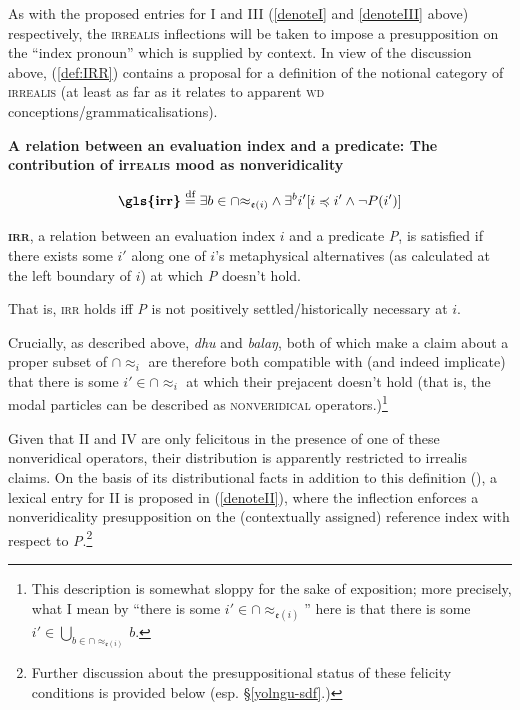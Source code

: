 \xe



As with the proposed entries for \gls{I} and \gls{III} (\ref{denoteI} and \ref{denoteIII} above) respectively, the \textsc{irrealis} inflections will be taken to impose a presupposition on the ``index pronoun'' which is supplied by context. In view of the discussion above, (\ref{def:IRR}) contains a proposal for a definition of the notional category of \textsc{irrealis} (at least as far as it relates to apparent \textsc{wd} conceptions\slash{}grammatical\-isations). 




\ex \textbf{A relation between an evaluation index and a predicate: The contribution of \gls{irr}\textsc{ealis} mood as nonveridicality}\label{def:IRR}


$$ \textbf{\gls{irr}}\overset{\text{df}}{=} \exists b\in\cap{\approx_{\mathfrak e(i)}}\wedge\exists^b i'[i\preccurlyeq i'\wedge\neg P(i')] $$

\textbf{\textsc{irr}}, a relation between an evaluation index $ i $ and a predicate \textit{P}, is satisfied if there exists some $ i' $ along one of $ i $'s metaphysical alternatives (as calculated at the left boundary of $ i $) at which \textit{P} doesn't hold.

That is, \textsc{irr} holds iff \textit{P} is not positively settled/historically necessary at $ i $.

\xe


Crucially, as described above, \textit{dhu} and \textit{balaŋ}, both of which make a claim about a proper subset of $ \cap{\approx_i} $ are therefore both compatible with (and indeed implicate) that there is some $ i'\in\cap{\approx_i} $ at which their prejacent doesn't hold (that is, the modal particles can be described as \textsc{nonveridical} operators.)\footnote{This description is somewhat sloppy for the sake of exposition; more precisely, what I mean by ``there is some $ i'\in\cap{\approx_{\mathfrak e(i)}} $'' here is that there is some $ i' \in \bigcup\limits_{b\in\cap{\approx_{\mathfrak e(i)}}}\!b$.}

Given that \gls{II} and \gls{IV} are only felicitous in the presence of one of these nonveridical operators, their distribution is apparently restricted to irrealis claims. On the basis of its distributional facts in addition to this definition (\lastx), a lexical entry for \gls{II} is proposed in (\ref{denoteII}), where the inflection enforces a nonveridicality presupposition on the (contextually assigned) reference index with respect to \textit{P}.\footnote{Further discussion about the presuppositional status of these felicity conditions is provided below (esp. \S\ref{yolngu-sdf}.)}

